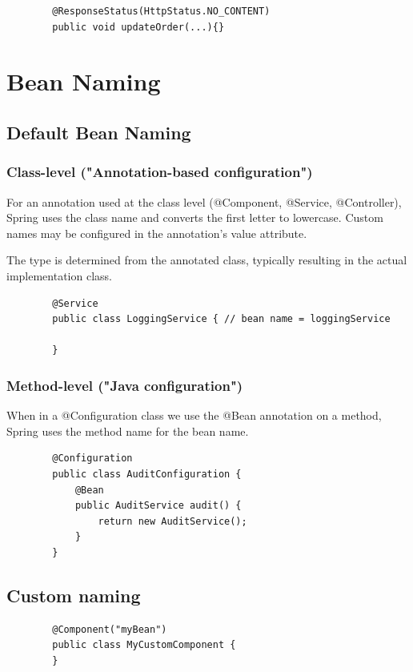\documentclass{scrartcl}
\begin{document}
    \begin{lstlisting}
        @ResponseStatus(HttpStatus.NO_CONTENT)
        public void updateOrder(...){}
    \end{lstlisting}


\section{Bean Naming}
\label{sec:bean-naming}
\subsection{Default Bean Naming}
\subsubsection{Class-level ("Annotation-based configuration")}
For an annotation used at the class level (@Component, @Service, @Controller), Spring uses the class name and converts the first letter to lowercase.
Custom names may be configured in the annotation's value attribute.

The type is determined from the annotated class, typically resulting in the actual
implementation class.

    \begin{lstlisting}
        @Service
        public class LoggingService { // bean name = loggingService

        }
    \end{lstlisting}

\subsubsection{Method-level ("Java configuration")}
When in a @Configuration class we use the @Bean annotation on a method, Spring uses the method name for the bean name.

    \begin{lstlisting}
        @Configuration
        public class AuditConfiguration {
            @Bean
            public AuditService audit() {
                return new AuditService();
            }
        }
    \end{lstlisting}

\subsection{Custom naming}

    \begin{lstlisting}
        @Component("myBean")
        public class MyCustomComponent {
        }
    \end{lstlisting}
\end{document}
